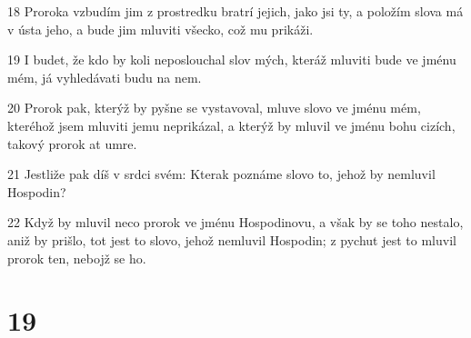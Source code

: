 \par 18 Proroka vzbudím jim z prostredku bratrí jejich, jako jsi ty, a položím slova má v ústa jeho, a bude jim mluviti všecko, což mu prikáži.
\par 19 I budet, že kdo by koli neposlouchal slov mých, kteráž mluviti bude ve jménu mém, já vyhledávati budu na nem.
\par 20 Prorok pak, kterýž by pyšne se vystavoval, mluve slovo ve jménu mém, kteréhož jsem mluviti jemu neprikázal, a kterýž by mluvil ve jménu bohu cizích, takový prorok at umre.
\par 21 Jestliže pak díš v srdci svém: Kterak poznáme slovo to, jehož by nemluvil Hospodin?
\par 22 Když by mluvil neco prorok ve jménu Hospodinovu, a však by se toho nestalo, aniž by prišlo, tot jest to slovo, jehož nemluvil Hospodin; z pychut jest to mluvil prorok ten, nebojž se ho.

\chapter{19}

